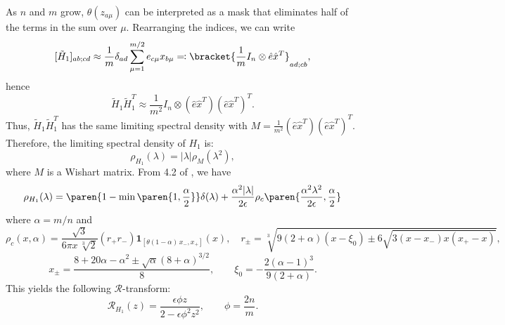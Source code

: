 \documentclass[notitlepage]{report}
\begin{document}
As $n$ and $m$ grow, $\theta(z_{a\mu})$ can be interpreted as a mask that eliminates half of the terms in the sum over $\mu$. Rearranging the indices, we can write
\[ [\tilde H_1]_{ab;cd} \approx \frac 1m \delta_{ad} \sum_{\mu=1}^{m/2} e_{c\mu}x_{b\mu} \eqqcolon \bracket{\frac 1m I_n\otimes \hat e\hat x^T}_{ad;cb}, \]
hence
\[ \tilde H_1 \tilde H_1^T \approx \frac 1{m^2} I_n\otimes (\hat e\hat x^T)(\hat e\hat x^T)^T. \]
Thus, $\tilde H_1\tilde H_1^T$ has the same limiting spectral density with $M= \frac 1{m^2} (\hat e \hat x^T)(\hat e \hat x^T)^T$. Therefore, the limiting spectral density of $H_1$ is:
\[ \rho_{H_1}(\lambda) = |\lambda| \rho_M(\lambda^2), \]
where $M$ is a Wishart matrix. From 4.2 of \cite{dupic-castillo}, we have
\[ \rho_{H_1}(\lambda) = \paren{1 - \min\paren{1,\frac\alpha 2}}\delta(\lambda) + \frac{\alpha^2|\lambda|}{2\epsilon}\rho_c\paren{\frac{\alpha^2\lambda^2}{2\epsilon},\frac\alpha 2} \]
where $\alpha = m/n$ and
\[ \rho_c(x,\alpha) = \frac{\sqrt 3}{6\pi x\,\sqrt[3]2}(r_+ r_-) \mathbf 1_{[\theta(1-\alpha)\,x_-, x_+]}(x),\quad r_\pm = \sqrt[3]{9(2+\alpha)(x-\xi_0)\pm 6\sqrt{3(x-x_-)x(x_+-x)}}, \]
\[ x_\pm = \frac{8+20\alpha - \alpha^2 \pm \sqrt \alpha (8+\alpha)^{3/2}}8,\qquad \xi_0 = -\frac{2 (\alpha-1)^3}{9(2+\alpha)}. \]
This yields the following $\mathcal R$-transform:
\[ \mathcal R_{H_1 }(z) = \frac{\epsilon\phi z}{2-\epsilon\phi^2 z^2},\qquad \phi = \frac{2n}m. \]
\end{document}
